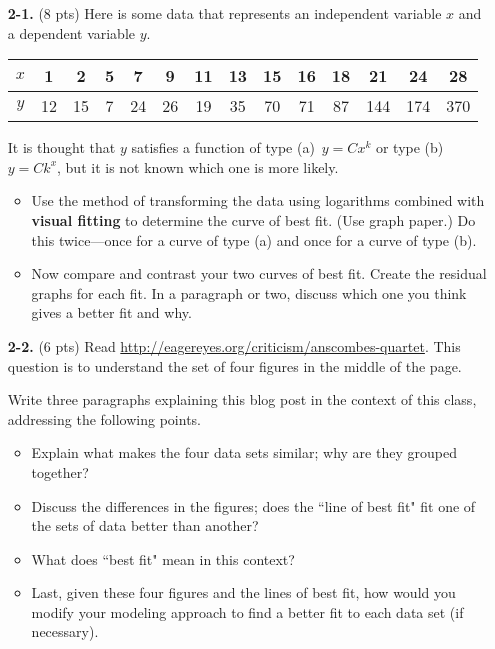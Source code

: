 \documentclass[12pt]{article}
\begin{document}
\begin{enumerate}
\item[\bf 2-1.] (8 pts) Here is some data that represents an independent variable $x$ and a dependent variable $y$. 
\begin{center}
\begin{tabular}{|c|ccccccccccccc|}\hline
$x$ & 1 & 2 & 5 & 7 & 9 & 11 & 13 & 15 & 16 & 18 & 21 & 24 & 28\\ \hline
$y$ & 12 & 15 & 7 & 24 & 26 & 19 & 35 & 70 & 71 & 87 & 144 & 174 & 370 \\ \hline
\end{tabular}
\end{center}

It is thought that $y$ satisfies a function of type (a)~$y=Cx^k$ or type (b)~$y=Ck^x$, but it is not known which one is more likely.  
\begin{itemize}
\item Use the method of transforming the data using logarithms combined with {\bf visual fitting} to determine the curve of best fit.  (Use graph paper.)  \newline Do this twice---once for a curve of type (a) and once for a curve of type (b).
\item Now compare and contrast your two curves of best fit.  Create the residual graphs for each fit.  In a paragraph or two, discuss which one you think gives a better fit and why.  
\end{itemize}


\item[\bf 2-2.] (6 pts) Read \url{http://eagereyes.org/criticism/anscombes-quartet}.  This question is to understand the set of four figures in the middle of the page.  

Write three paragraphs explaining this blog post in the context of this class, addressing the following points.  
\begin{itemize}
\item Explain what makes the four data sets similar; why are they grouped together?  
\item Discuss the differences in the figures; does the ``line of best fit" fit one of the sets of data better than another?  
\item What does ``best fit" mean in this context?  
\item Last, given these four figures and the lines of best fit, how would you modify your modeling approach to find a better fit to each data set (if necessary).
\end{itemize}


\end{enumerate}
\end{document}
